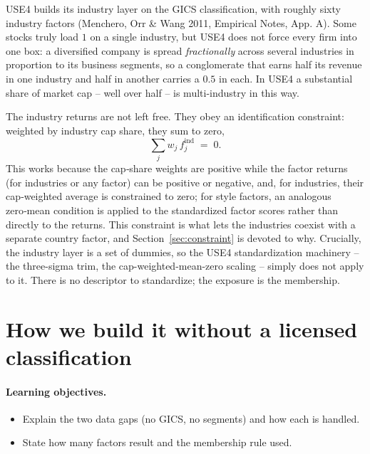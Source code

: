 \documentclass[11pt]{article}
\theoremstyle{definition}
\theoremstyle{plain}
\theoremstyle{remark}
\begin{document}
USE4 builds its industry layer on the GICS classification, with roughly sixty industry factors (Menchero, Orr \& Wang 2011, Empirical Notes, App. A). Some stocks truly load $1$ on a single industry, but USE4 does not force every firm into one box: a diversified company is spread \emph{fractionally} across several industries in proportion to its business segments, so a conglomerate that earns half its revenue in one industry and half in another carries a $0.5$ in each. In USE4 a substantial share of market cap -- well over half -- is multi-industry in this way.

The industry returns are not left free. They obey an identification constraint: weighted by industry cap share, they sum to zero,
\[
\sum_{j} w_j\, f^{\text{ind}}_j \;=\; 0 .
\]
This works because the cap‑share weights are positive while the factor returns (for industries or any factor) can be positive or negative, and, for industries, their cap‑weighted average is constrained to zero; for style factors, an analogous zero‑mean condition is applied to the standardized factor scores rather than directly to the returns. This constraint is what lets the industries coexist with a separate country factor, and Section~\ref{sec:constraint} is devoted to why. Crucially, the industry layer is a set of dummies, so the USE4 standardization machinery -- the three-sigma trim, the cap-weighted-mean-zero scaling -- simply does not apply to it. There is no descriptor to standardize; the exposure is the membership.

\section{How we build it without a licensed classification}\label{sec:build}

\paragraph{Learning objectives.}
\begin{itemize}[leftmargin=1.4em,topsep=2pt]
  \item Explain the two data gaps (no GICS, no segments) and how each is handled.
  \item State how many factors result and the membership rule used.
\end{itemize}
\end{document}
